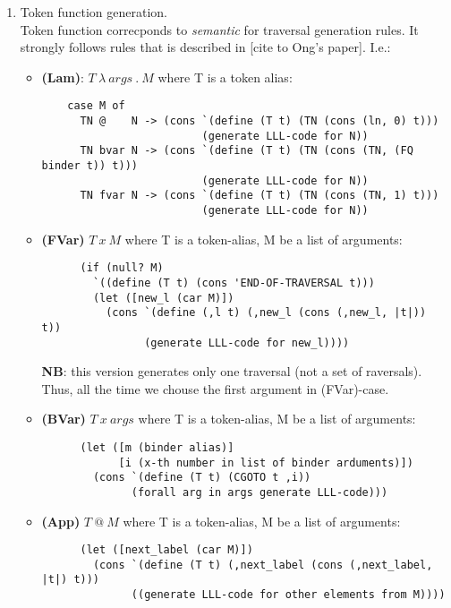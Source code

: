\documentclass[a4paper, 10pt]{article}
\begin{document}
\begin{enumerate}
\item Token function generation.\\Token function correcponds to \textit{semantic} for traversal generation rules. It strongly follows rules that is described in [cite to Ong's paper]. I.e.:
  \begin{itemize}
  \item \textbf{(Lam)}: $T\ \lambda\ args\ .\ M$ where T is a token alias:
    \begin{verbatim}
    case M of
      TN @    N -> (cons `(define (T t) (TN (cons (ln, 0) t)))
                         (generate LLL-code for N))
      TN bvar N -> (cons `(define (T t) (TN (cons (TN, (FQ binder t)) t)))
                         (generate LLL-code for N))
      TN fvar N -> (cons `(define (T t) (TN (cons (TN, 1) t)))
                         (generate LLL-code for N))
    \end{verbatim}
  \item \textbf{(FVar)} $T\ x\ M$ where T is a token-alias, M be a list of arguments:
    \begin{verbatim}
      (if (null? M)
        `((define (T t) (cons 'END-OF-TRAVERSAL t)))
        (let ([new_l (car M)])
          (cons `(define (,l t) (,new_l (cons (,new_l, |t|)) t))
                (generate LLL-code for new_l))))
    \end{verbatim}
    \textbf{NB}: this version generates only one traversal (not a set of raversals). Thus, all the time we chouse the first argument in (FVar)-case.
  \item \textbf{(BVar)} $T\ x\ args$ where T is a token-alias, M be a list of arguments:
    \begin{verbatim}
      (let ([m (binder alias)]
            [i (x-th number in list of binder arduments)])
        (cons `(define (T t) (CGOTO t ,i))
              (forall arg in args generate LLL-code)))
    \end{verbatim}
  \item \textbf{(App)} $T\ @\ M$ where T is a token-alias, M be a list of arguments:
    \begin{verbatim}
      (let ([next_label (car M)])
        (cons `(define (T t) (,next_label (cons (,next_label, |t|) t)))
              ((generate LLL-code for other elements from M))))
    \end{verbatim}
  \end{itemize}


\end{enumerate}
\end{document}

